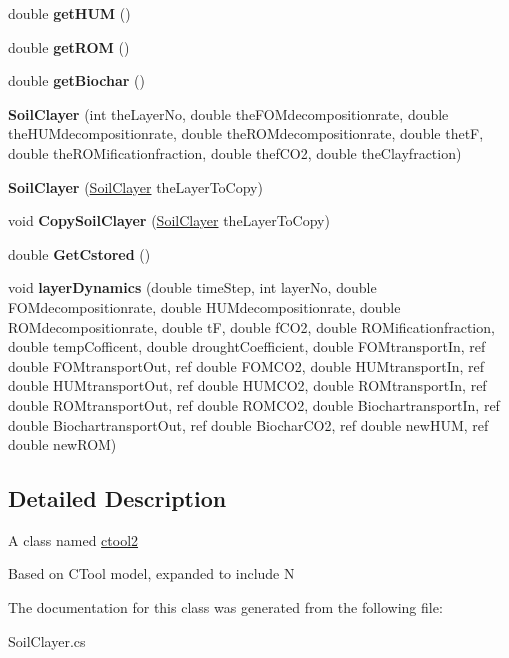 \begin{DoxyCompactItemize}
\mbox{\label{class_soil_clayer_a812e0724750bf9f46786e8a87cae136b}} 
double {\bfseries get\+H\+UM} ()
\item 
\mbox{\label{class_soil_clayer_ac51bdc01741ef3ea1ae864570c2cb0b6}} 
double {\bfseries get\+R\+OM} ()
\item 
\mbox{\label{class_soil_clayer_ab9deb728c9bb9e7da4366d3d321a77f3}} 
double {\bfseries get\+Biochar} ()
\item 
\mbox{\label{class_soil_clayer_a15c997e1a6abeee1477fdac2bf0ecb6b}} 
{\bfseries Soil\+Clayer} (int the\+Layer\+No, double the\+F\+O\+Mdecompositionrate, double the\+H\+U\+Mdecompositionrate, double the\+R\+O\+Mdecompositionrate, double thetF, double the\+R\+O\+Mificationfraction, double thef\+C\+O2, double the\+Clayfraction)
\item 
\mbox{\label{class_soil_clayer_af6c5d1771dfa373500e42dad9e2afd9a}} 
{\bfseries Soil\+Clayer} (\mbox{\hyperlink{class_soil_clayer}{Soil\+Clayer}} the\+Layer\+To\+Copy)
\item 
\mbox{\label{class_soil_clayer_a69593b3579da59ceffba75eb36925dbe}} 
void {\bfseries Copy\+Soil\+Clayer} (\mbox{\hyperlink{class_soil_clayer}{Soil\+Clayer}} the\+Layer\+To\+Copy)
\item 
\mbox{\label{class_soil_clayer_a923605f07e10f457141e5591ec5c1474}} 
double {\bfseries Get\+Cstored} ()
\item 
\mbox{\label{class_soil_clayer_aad1857ed846342af4b6a152e0d6a9dd8}} 
void {\bfseries layer\+Dynamics} (double time\+Step, int layer\+No, double F\+O\+Mdecompositionrate, double H\+U\+Mdecompositionrate, double R\+O\+Mdecompositionrate, double tF, double f\+C\+O2, double R\+O\+Mificationfraction, double temp\+Cofficent, double drought\+Coefficient, double F\+O\+Mtransport\+In, ref double F\+O\+Mtransport\+Out, ref double F\+O\+M\+C\+O2, double H\+U\+Mtransport\+In, ref double H\+U\+Mtransport\+Out, ref double H\+U\+M\+C\+O2, double R\+O\+Mtransport\+In, ref double R\+O\+Mtransport\+Out, ref double R\+O\+M\+C\+O2, double Biochartransport\+In, ref double Biochartransport\+Out, ref double Biochar\+C\+O2, ref double new\+H\+UM, ref double new\+R\+OM)
\end{DoxyCompactItemize}


\subsection{Detailed Description}
A class named \mbox{\hyperlink{classctool2}{ctool2}}

Based on C\+Tool model, expanded to include N 

The documentation for this class was generated from the following file\+:\begin{DoxyCompactItemize}
\item 
Soil\+Clayer.\+cs\end{DoxyCompactItemize}
